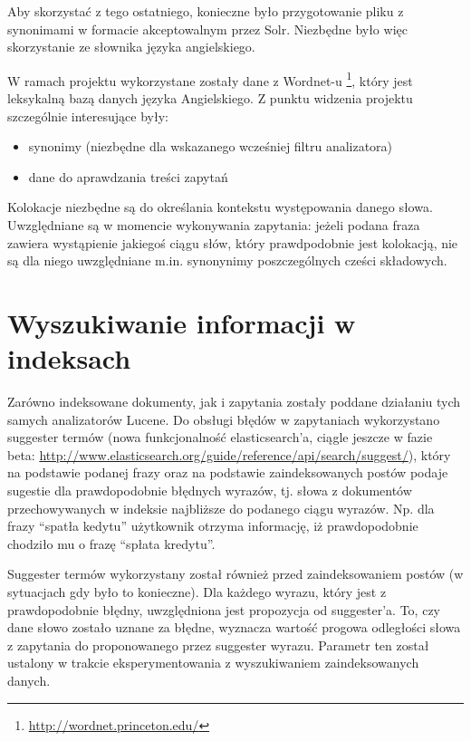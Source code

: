 \documentclass[runningheads]{llncs}
\begin{document}
Aby skorzystać z tego ostatniego, konieczne było przygotowanie pliku z
synonimami w formacie akceptowalnym przez Solr. Niezbędne było więc skorzystanie
ze słownika języka angielskiego.

W ramach projektu wykorzystane zostały dane z  Wordnet-u
\footnote{\url{http://wordnet.princeton.edu/}}, który jest leksykalną bazą
danych języka Angielskiego. Z punktu widzenia projektu szczególnie interesujące
były:
\begin{itemize}
  \item synonimy (niezbędne dla wskazanego wcześniej filtru analizatora)
  \item dane do aprawdzania treści zapytań
\end{itemize}

Kolokacje niezbędne są do określania kontekstu występowania danego słowa. 
Uwzględniane są w momencie wykonywania zapytania: jeżeli podana fraza zawiera
wystąpienie jakiegoś ciągu słów, który  prawdpodobnie jest kolokacją, nie są
dla niego uwzględniane m.in. synonynimy poszczególnych cześci składowych.

\section{Wyszukiwanie informacji w indeksach}
\label{sec:wyszukiwanie-informacji-w-indeksach}
Zarówno indeksowane dokumenty, jak i zapytania zostały poddane działaniu tych
samych analizatorów Lucene.
Do obsługi błędów w zapytaniach  wykorzystano suggester termów (nowa
funkcjonalność elasticsearch’a, ciągle jeszcze w fazie beta:
\url{http://www.elasticsearch.org/guide/reference/api/search/suggest/}), który
na podstawie podanej frazy oraz na podstawie zaindeksowanych  postów podaje
sugestie dla prawdopodobnie błędnych wyrazów, tj. słowa  z dokumentów
przechowywanych w indeksie najbliższe do podanego ciągu wyrazów. Np.  dla frazy
“spatła kedytu” użytkownik otrzyma informację, iż prawdopodobnie chodziło mu o
frazę “spłata kredytu”.

Suggester termów wykorzystany został również przed zaindeksowaniem postów (w
sytuacjach gdy było to konieczne).
Dla każdego wyrazu, który jest z prawdopodobnie błędny, uwzględniona jest
propozycja od suggester’a. To, czy dane słowo zostało uznane za błędne,
wyznacza wartość progowa odległości słowa z zapytania do  proponowanego przez
suggester wyrazu. Parametr ten został ustalony  w trakcie eksperymentowania z
wyszukiwaniem zaindeksowanych danych. 

\end{document}

